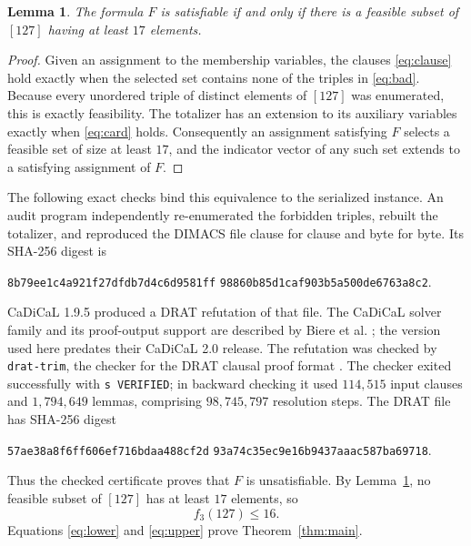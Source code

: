 \documentclass[11pt]{article}
\newtheorem{lemma}{Lemma}
\begin{document}
\begin{lemma}\label{lem:encoding}
The formula $F$ is satisfiable if and only if there is a feasible subset of
$[127]$ having at least $17$ elements.
\end{lemma}

\begin{proof}
Given an assignment to the membership variables, the clauses
\eqref{eq:clause} hold exactly when the selected set contains none of the
triples in \eqref{eq:bad}.  Because every unordered triple of distinct
elements of $[127]$ was enumerated, this is exactly feasibility.  The
totalizer has an extension to its auxiliary variables exactly when
\eqref{eq:card} holds.  Consequently an assignment satisfying $F$ selects a
feasible set of size at least $17$, and the indicator vector of any such set
extends to a satisfying assignment of $F$.
\end{proof}

The following exact checks bind this equivalence to the serialized instance.
An audit program independently re-enumerated the forbidden triples, rebuilt
the totalizer, and reproduced the DIMACS file clause for clause and byte for
byte.  Its SHA-256 digest is
\begin{center}
\texttt{8b79ee1c4a921f27dfdb7d4c6d9581ff}\allowbreak
\texttt{98860b85d1caf903b5a500de6763a8c2}.
\end{center}
CaDiCaL 1.9.5 produced a DRAT refutation of that file.  The CaDiCaL solver
family and its proof-output support are described by Biere et al.
\cite{BiereEtAl2024}; the version used here predates their CaDiCaL 2.0 release.
The refutation was checked by \texttt{drat-trim}, the checker for the DRAT
clausal proof format \cite{WetzlerEtAl2014}.  The checker exited successfully
with \texttt{s VERIFIED}; in backward checking it used $114{,}515$ input
clauses and $1{,}794{,}649$ lemmas, comprising $98{,}745{,}797$ resolution
steps.  The DRAT file has SHA-256 digest
\begin{center}
\texttt{57ae38a8f6ff606ef716bdaa488cf2d}\allowbreak
\texttt{93a74c35ec9e16b9437aaac587ba69718}.
\end{center}
Thus the checked certificate proves that $F$ is unsatisfiable.  By
Lemma~\ref{lem:encoding}, no feasible subset of $[127]$ has at least $17$
elements, so
\begin{equation}\label{eq:upper}
 f_3(127)\leq16.
\end{equation}
Equations \eqref{eq:lower} and \eqref{eq:upper} prove
Theorem~\ref{thm:main}.
\end{document}
